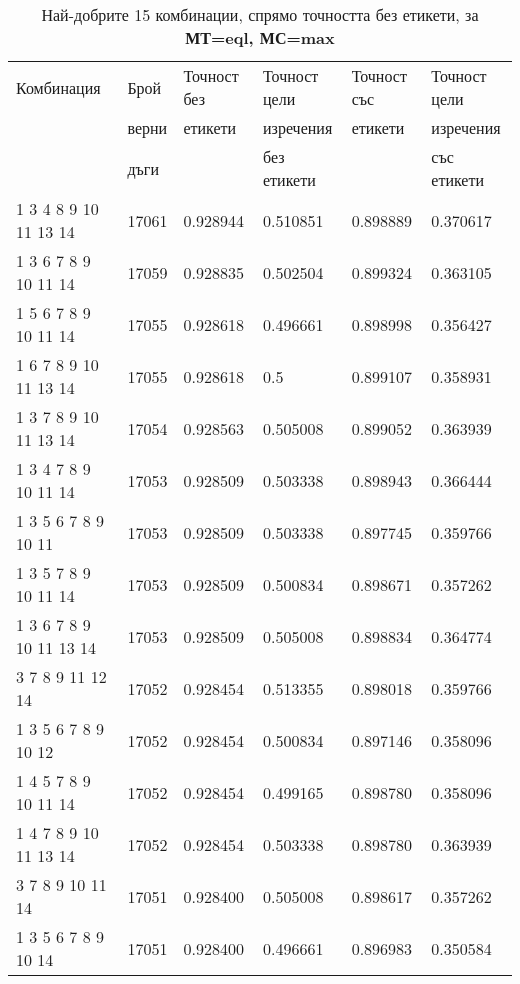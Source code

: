 \begin{table}[!htb] 
\caption{Най-добрите 15 комбинации, спрямо точността без етикети, за \textbf{МТ=eql, МС=max}}
  \begin{tabular}{|l|l|l|l|l|l|}
\hline 
Комбинация & Брой  & Точност без  & Точност цели  & Точност със  & Точност цели  \\
 & верни	& етикети & изречения & етикети & изречения \\
 & дъги	& 	& без етикети & 	& със етикети \\
\hline 
1 3 4 8 9 10 11 13 14 &	17061 &	0.928944 &	0.510851 &	0.898889 &	0.370617\\ 
\hline 
1 3 6 7 8 9 10 11 14 &	17059 &	0.928835 &	0.502504 &	0.899324 &	0.363105\\ 
\hline 
1 5 6 7 8 9 10 11 14 &	17055 &	0.928618 &	0.496661 &	0.898998 &	0.356427\\ 
\hline 
1 6 7 8 9 10 11 13 14 &	17055 &	0.928618 &	0.5 &	0.899107 &	0.358931\\ 
\hline 
1 3 7 8 9 10 11 13 14 &	17054 &	0.928563 &	0.505008 &	0.899052 &	0.363939\\ 
\hline 
1 3 4 7 8 9 10 11 14 &	17053 &	0.928509 &	0.503338 &	0.898943 &	0.366444\\ 
\hline 
1 3 5 6 7 8 9 10 11 &	17053 &	0.928509 &	0.503338 &	0.897745 &	0.359766\\ 
\hline 
1 3 5 7 8 9 10 11 14 &	17053 &	0.928509 &	0.500834 &	0.898671 &	0.357262\\ 
\hline 
1 3 6 7 8 9 10 11 13 14 &	17053 &	0.928509 &	0.505008 &	0.898834 &	0.364774\\ 
\hline 
3 7 8 9 11 12 14 &	17052 &	0.928454 &	0.513355 &	0.898018 &	0.359766\\ 
\hline 
1 3 5 6 7 8 9 10 12 &	17052 &	0.928454 &	0.500834 &	0.897146 &	0.358096\\ 
\hline 
1 4 5 7 8 9 10 11 14 &	17052 &	0.928454 &	0.499165 &	0.898780 &	0.358096\\ 
\hline 
1 4 7 8 9 10 11 13 14 &	17052 &	0.928454 &	0.503338 &	0.898780 &	0.363939\\ 
\hline 
3 7 8 9 10 11 14 &	17051 &	0.928400 &	0.505008 &	0.898617 &	0.357262\\ 
\hline 
1 3 5 6 7 8 9 10 14 &	17051 &	0.928400 &	0.496661 &	0.896983 &	0.350584\\ 
\hline 
 \end{tabular}
 \label{tab:lab_max_eql}
 \end{table}
